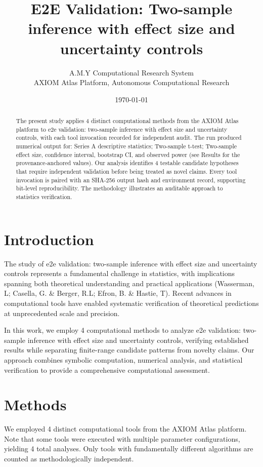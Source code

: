 \documentclass[11pt,a4paper]{article}
\title{E2E Validation: Two-sample inference with effect size and uncertainty controls}
\author{A.M.Y Computational Research System\\
\small AXIOM Atlas Platform, Autonomous Computational Research}
\date{\today}
\begin{document}
\maketitle

\begin{abstract}
The present study applies 4 distinct computational methods from the AXIOM Atlas platform to e2e validation: two-sample inference with effect size and uncertainty controls, with each tool invocation recorded for independent audit. The run produced numerical output for: Series A descriptive statistics; Two-sample t-test; Two-sample effect size, confidence interval, bootstrap CI, and observed power (see Results for the provenance-anchored values). Our analysis identifies 4 testable candidate hypotheses that require independent validation before being treated as novel claims. Every tool invocation is paired with an SHA-256 output hash and environment record, supporting bit-level reproducibility. The methodology illustrates an auditable approach to statistics verification.
\end{abstract}

\section{Introduction}
The study of e2e validation: two-sample inference with effect size and uncertainty controls represents a fundamental challenge in statistics, with implications spanning both theoretical understanding and practical applications (Wasserman, L; Casella, G. \& Berger, R.L; Efron, B. \& Hastie, T). Recent advances in computational tools have enabled systematic verification of theoretical predictions at unprecedented scale and precision.

In this work, we employ 4 computational methods to analyze e2e validation: two-sample inference with effect size and uncertainty controls, verifying established results while separating finite-range candidate patterns from novelty claims. Our approach combines symbolic computation, numerical analysis, and statistical verification to provide a comprehensive computational assessment.


\section{Methods}
We employed 4 distinct computational tools from the AXIOM Atlas platform. Note that some tools were executed with multiple parameter configurations, yielding 4 total analyses. Only tools with fundamentally different algorithms are counted as methodologically independent.
\end{document}
